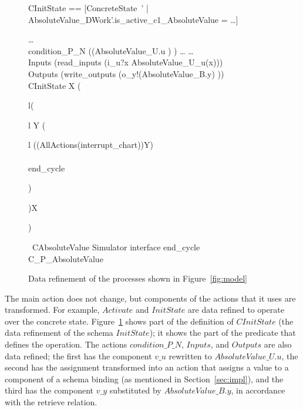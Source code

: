\documentclass[submission]{eptcs}
\renewcommand{\circblockbegin}{\left(\begin{array}{l}}
\renewcommand{\circblockend}{\end{array}\right)}
\begin{document}
\begin{figure}
\begin{minipage}{\textwidth}
\begin{zed}
CInitState == [ConcreteState~' | AbsoluteValue\_DWork'.is\_active\_c1\_AbsoluteValue = \false \land \ldots]\\
\end{zed}
\vspace{-1.5cm}
\begin{circusaction}
\ldots\\
condition\_P\_N \circdef \circif ((AbsoluteValue\_U.u ) ) \circthen \ldots
\ldots\\
Inputs \circdef (read\_inputs \then (i\_u?x \then AbsoluteValue\_U\_u(x)))\\
Outputs \circdef (write\_outputs \then (o\_y!(AbsoluteValue\_B.y) \then \Skip))\\
\circspot \lschexpract CInitState \rschexpract \circseq
\circmu X \circspot \circblockbegin\circblockbegin
\circmu Y \circspot
\circblockbegin
((AllActions\circinterrupt(interrupt\_chart\then\Skip))\circseq Y)\\
\extchoice\\
end\_cycle\then\Skip
\circblockend
\circblockend\circseq X\circblockend\\
\circend
\end{circusaction}
\vspace{-1cm}
\begin{circus}
\circprocess~CAbsoluteValue \circdef Simulator \lpar interface \cup \lchanset end\_cycle \rchanset \rpar C\_P\_AbsoluteValue
\end{circus}
\end{minipage}
\caption{Data refinement of the processes shown in Figure~\ref{fig:model}}
\label{fig:data-refined-model}
\end{figure}

The main action does not change, but components of the actions that it uses are transformed. For example, $Activate$ and $InitState$ are data refined to operate over the concrete state. Figure~\ref{fig:data-refined-model} shows part of the definition of $CInitState$ (the data refinement of the schema $InitState$); it shows the part of the predicate that defines the operation. The actions $condition\_P\_N$, $Inputs$, and $Outputs$ are also data refined; the first has the component $v\_u$ rewritten to $AbsoluteValue\_U.u$, the second has the assignment transformed into an action that assigns a value to a component of a schema binding (as mentioned in Section~\ref{sec:impl}), and the third has the component $v\_y$ substituted by $AbsoluteValue\_B.y$, in accordance with the retrieve relation.
\end{document}
